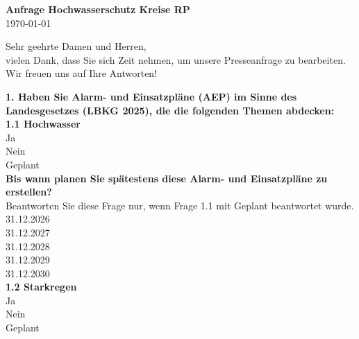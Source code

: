 \documentclass[12pt]{article}
\begin{document}
  \begin{center}
  {\LARGE \textbf{\textcolor{swr_purple}{Anfrage Hochwasserschutz Kreise RP}}}\\[1em]
  {\large \today}
  \end{center}
  {Sehr geehrte Damen und Herren,\\ vielen Dank, dass Sie sich
  Zeit nehmen, um unsere Presseanfrage zu bearbeiten.\\
  Wir freuen uns auf Ihre Antworten!}

  \vspace{1cm}

  \begin{Form}
  \needspace{5cm}
\large \textbf{\textcolor{swr_purple}{1. Haben Sie Alarm- und Einsatzpläne (AEP) im Sinne des Landesgesetzes (LBKG 2025), die die folgenden Themen abdecken:}}\normalsize\\[0.5em]

\needspace{5cm}
\large \textbf{\textcolor{swr_purple}{1.1 Hochwasser}}\normalsize\\[0.5em]
\ChoiceMenu[radio, name=q_G01Q02, bordercolor={0.7 0.7 0.7}]{}{= } Ja\\
\ChoiceMenu[radio, name=q_G01Q02, bordercolor={0.7 0.7 0.7}]{}{= } Nein\\
\ChoiceMenu[radio, name=q_G01Q02, bordercolor={0.7 0.7 0.7}]{}{= } Geplant\\

\needspace{5cm}
\large \textbf{\textcolor{swr_purple}{Bis wann planen Sie spätestens diese Alarm- und Einsatzpläne zu erstellen?}}\normalsize\\[0.5em]
 Beantworten Sie diese Frage nur, wenn Frage 1.1 mit Geplant beantwortet wurde.\\[0.5em]
\ChoiceMenu[radio, name=q_G01Q03, bordercolor={0.7 0.7 0.7}]{}{= } 31.12.2026\\
\ChoiceMenu[radio, name=q_G01Q03, bordercolor={0.7 0.7 0.7}]{}{= } 31.12.2027\\
\ChoiceMenu[radio, name=q_G01Q03, bordercolor={0.7 0.7 0.7}]{}{= } 31.12.2028\\
\ChoiceMenu[radio, name=q_G01Q03, bordercolor={0.7 0.7 0.7}]{}{= } 31.12.2029\\
\ChoiceMenu[radio, name=q_G01Q03, bordercolor={0.7 0.7 0.7}]{}{= } 31.12.2030\\

\needspace{5cm}
\large \textbf{\textcolor{swr_purple}{1.2 Starkregen}}\normalsize\\[0.5em]
\ChoiceMenu[radio, name=q_G01Q04, bordercolor={0.7 0.7 0.7}]{}{= } Ja\\
\ChoiceMenu[radio, name=q_G01Q04, bordercolor={0.7 0.7 0.7}]{}{= } Nein\\
\ChoiceMenu[radio, name=q_G01Q04, bordercolor={0.7 0.7 0.7}]{}{= } Geplant\\


\end{Form}
\end{document}
